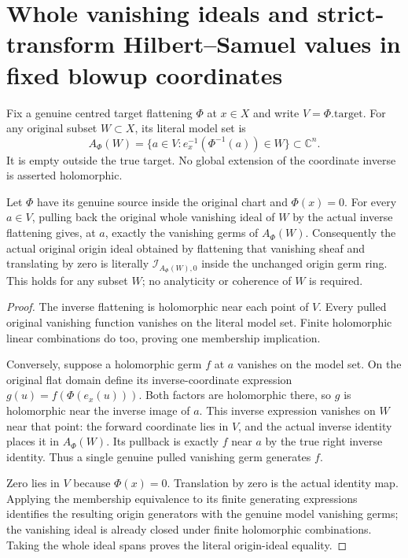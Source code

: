 \section{Whole vanishing ideals and strict-transform Hilbert--Samuel values in fixed blowup coordinates}
\label{sec:hironaka-actual-fixed-flattening-hs-comparison}

Fix a genuine centred target flattening $\Phi$ at $x\in X$ and
write $V=\Phi.\mathrm{target}$. For any original subset $W\subset X$,
its literal model set is
\[
 A_\Phi(W)=\{a\in V:e_x^{-1}(\Phi^{-1}(a))\in W\}\subset\mathbb C^n.
\]
It is empty outside the true target. No global extension of the
coordinate inverse is asserted holomorphic.

\begin{theorem}
\label{hir:actual-fixed-flattening-whole-model-vanishing-ideal}
\leanok
Let $\Phi$ have its genuine source inside the original chart and
$\Phi(x)=0$. For every $a\in V$, pulling back the original whole
vanishing ideal of $W$ by the actual inverse flattening gives,
at $a$, exactly the vanishing germs of $A_\Phi(W)$. Consequently
the actual original origin ideal obtained by flattening that
vanishing sheaf and translating by zero is literally
$\mathcal I_{A_\Phi(W),0}$ inside the unchanged origin germ ring.
This holds for any subset $W$; no analyticity or coherence of
$W$ is required.
\end{theorem}
\begin{proof}
The inverse flattening is holomorphic near each point of $V$.
Every pulled original vanishing function vanishes on the literal
model set. Finite holomorphic linear combinations do too, proving
one membership implication.

Conversely, suppose a holomorphic germ $f$ at $a$ vanishes on the
model set. On the original flat domain define its inverse-coordinate
expression $g(u)=f(\Phi(e_x(u)))$. Both factors are holomorphic
there, so $g$ is holomorphic near the inverse image of $a$.
This inverse expression vanishes on $W$ near that point: the
forward coordinate lies in $V$, and the actual inverse identity
places it in $A_\Phi(W)$. Its pullback is exactly $f$ near $a$
by the true right inverse identity. Thus a single genuine pulled
vanishing germ generates $f$.

Zero lies in $V$ because $\Phi(x)=0$. Translation by zero is
the actual identity map. Applying the membership equivalence
to its finite generating expressions identifies the resulting
origin generators with the genuine model vanishing germs;
the vanishing ideal is already closed under finite holomorphic
combinations. Taking the whole ideal spans proves the literal
origin-ideal equality.
\end{proof}

